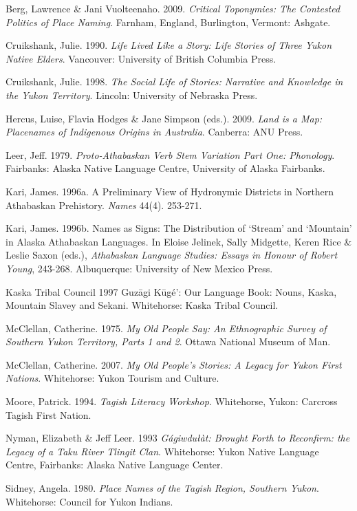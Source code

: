 \begin{hang}

Berg, Lawrence \& Jani Vuolteenaho. 2009.	\textit{Critical Toponymies: The Contested Politics of Place Naming}. Farnham, England, Burlington, Vermont: Ashgate.

Cruikshank, Julie. 1990. \textit{Life Lived Like a Story: Life Stories of Three Yukon Native Elders}. Vancouver: University of British Columbia Press.

Cruikshank, Julie. 1998. \textit{The Social Life of Stories: Narrative and Knowledge in the Yukon Territory}. Lincoln: University of Nebraska Press.

Hercus, Luise, Flavia Hodges \& Jane Simpson (eds.). 2009. \textit{Land is a Map: Placenames of Indigenous Origins in Australia}. Canberra: ANU Press.

Leer, Jeff. 1979. \textit{Proto-Athabaskan Verb Stem Variation Part One: Phonology}. Fairbanks: Alaska Native Language Centre, University of Alaska Fairbanks.

Kari, James. 1996a.	A Preliminary View of Hydronymic Districts in Northern Athabaskan Prehistory. \textit{Names} 44(4). 253-271.

Kari, James. 1996b. Names as Signs: The Distribution of ‘Stream’ and ‘Mountain’ in Alaska Athabaskan Languages. In Eloise Jelinek, Sally Midgette, Keren Rice \& Leslie Saxon (eds.), \textit{Athabaskan Language Studies: Essays in Honour of Robert Young}, 243-268. Albuquerque: University of New Mexico Press.

Kaska Tribal Council
1997	Guzāgi Kūgé’: Our Language Book: Nouns, Kaska, Mountain Slavey and Sekani. Whitehorse: Kaska Tribal Council.

McClellan, Catherine. 1975.	\textit{My Old People Say: An Ethnographic Survey of Southern Yukon Territory, Parts 1 and 2}. Ottawa National Museum of Man.

McClellan, Catherine. 2007.	\textit{My Old People’s Stories: A Legacy for Yukon First Nations}. Whitehorse: Yukon Tourism and Culture.

Moore, Patrick. 1994. \textit{Tagish Literacy Workshop}. Whitehorse, Yukon: Carcross Tagish First Nation.

Nyman, Elizabeth \& Jeff Leer. 1993 	\textit{Gágiwdułàt: Brought Forth to Reconfirm: the Legacy of a Taku River Tlingit Clan}. Whitehorse: Yukon Native Language Centre, Fairbanks: Alaska Native Language Center.

Sidney, Angela. 1980. \textit{Place Names of the Tagish Region, Southern Yukon}. Whitehorse: Council for Yukon Indians.


\end{hang}
